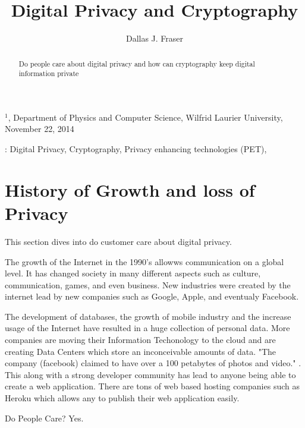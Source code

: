 \documentclass[12pt]{article}
\title{Digital Privacy and Cryptography}
\author{
	Dallas J. Fraser\inst{1}
}
\def\inst#1{$^{#1}$}
\begin{document}
\maketitle

\begin{center}
{\footnotesize

\inst{1}, Department of Physics and Computer Science, Wilfrid Laurier 
University, November 22, 2014}

\end{center}

\begin{abstract}
Do people care about digital privacy and how can cryptography keep digital information private
\end{abstract}

: Digital Privacy, Cryptography, Privacy enhancing technologies (PET),

\section{History of Growth and loss of Privacy}\label{sec:demand}
This section dives into do customer care about digital privacy.

 The growth of the Internet in the 1990's allowws communication on a global level. It has changed society in many different aspects such as culture, communication, games, and even business. New industries were created by the internet lead by new companies such as Google, Apple, and eventualy Facebook.

The development of databases, the growth of mobile industry  and the increase usage of the Internet have resulted in a huge collection of personal data. More companies are moving their Information Techonology to the cloud and are creating Data Centers which store an inconceivable amounts of data. "The company (facebook) claimed to have over a 100 petabytes of photos and video." \cite{Wallbank}. This along with a strong developer community has lead to anyone being able to create a web application. There are tons of web based hosting companies such as Heroku which allows any to publish their web application easily.

Do People Care?
Yes.
\end{document}
